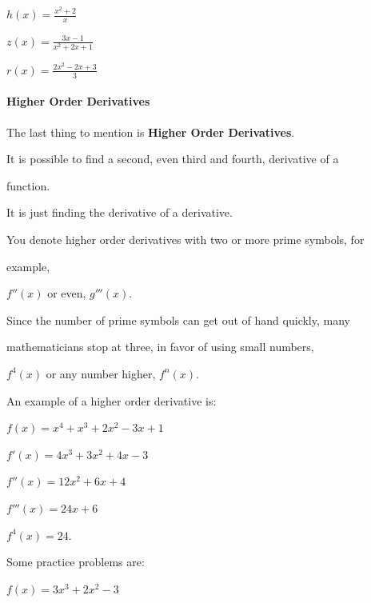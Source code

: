 {{{{$h(x) = \frac {x^2 + 2}{x}$



$z(x) = \frac {3x - 1}{x^2 + 2x + 1}$



$r(x) = \frac {2x^2 - 2x + 3}{3}$



\paragraph{Higher Order Derivatives}



The last thing to mention is \textbf{Higher Order Derivatives}.



It is possible to find a second, even third and fourth, derivative of a

function.



It is just finding the derivative of a derivative.



You denote higher order derivatives with two or more prime symbols, for

example,



$f''(x)$ or even, $g'''(x).$



Since the number of prime symbols can get out of hand quickly, many

mathematicians stop at three, in favor of using small numbers,



$f^4(x)$ or any number higher, $f^n(x).$



An example of a higher order derivative is:



$f(x) = x^4 + x^3 + 2x^2 - 3x + 1$



$f'(x) = 4x^3 + 3x^2 + 4x - 3$



$f''(x) = 12x^2 + 6x + 4$



$f'''(x) = 24x + 6$



$f^4(x) = 24.$



Some practice problems are:



$f(x) = 3x^3 + 2x^2 - 3$



}}}}
